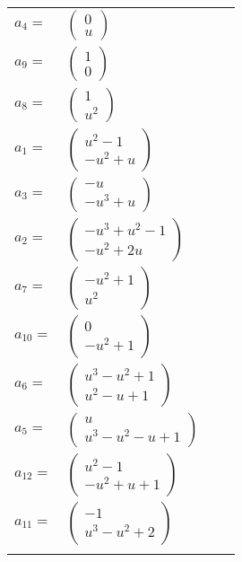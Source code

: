 \documentclass[1p]{elsarticle_modified}
\theoremstyle{definition}
\begin{document}
\begin{tabular}{m{7pt} m{180pt} m{7pt} m{180pt} }
\flushright $a_{4}=$&$\begin{pmatrix}0\\u\end{pmatrix}$ \\
\flushright $a_{9}=$&$\begin{pmatrix}1\\0\end{pmatrix}$ \\
\flushright $a_{8}=$&$\begin{pmatrix}1\\u^2\end{pmatrix}$ \\
\flushright $a_{1}=$&$\begin{pmatrix}u^2-1\\- u^2+u\end{pmatrix}$ \\
\flushright $a_{3}=$&$\begin{pmatrix}- u\\- u^3+u\end{pmatrix}$ \\
\flushright $a_{2}=$&$\begin{pmatrix}- u^3+u^2-1\\- u^2+2 u\end{pmatrix}$ \\
\flushright $a_{7}=$&$\begin{pmatrix}- u^2+1\\u^2\end{pmatrix}$ \\
\flushright $a_{10}=$&$\begin{pmatrix}0\\- u^2+1\end{pmatrix}$ \\
\flushright $a_{6}=$&$\begin{pmatrix}u^3- u^2+1\\u^2- u+1\end{pmatrix}$ \\
\flushright $a_{5}=$&$\begin{pmatrix}u\\u^3- u^2- u+1\end{pmatrix}$ \\
\flushright $a_{12}=$&$\begin{pmatrix}u^2-1\\- u^2+u+1\end{pmatrix}$ \\
\flushright $a_{11}=$&$\begin{pmatrix}-1\\u^3- u^2+2\end{pmatrix}$\\&\end{tabular}
\end{document}
